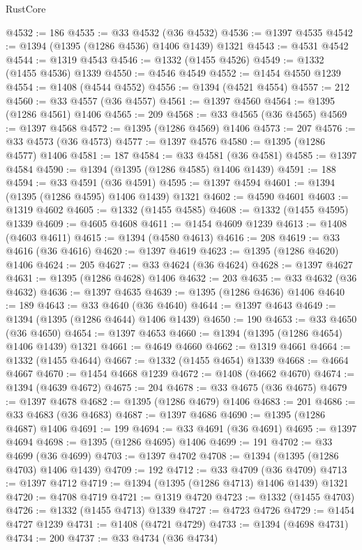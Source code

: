 \begin{lexlean}{RustCore}
\begin{coremodule}
@4532 := 186
@4535 := @33 @4532 (@36 @4532)
@4536 := @1397 @4535
@4542 := @1394 (@1395 (@1286 @4536) @1406 @1439) @1321
@4543 := @4531 @4542
@4544 := @1319 @4543
@4546 := @1332 (@1455 @4526)
@4549 := @1332 (@1455 @4536) @1339
@4550 := @4546 @4549
@4552 := @1454 @4550 @1239
@4554 := @1408 (@4544 @4552)
@4556 := @1394 (@4521 @4554)
@4557 := 212
@4560 := @33 @4557 (@36 @4557)
@4561 := @1397 @4560
@4564 := @1395 (@1286 @4561) @1406
@4565 := 209
@4568 := @33 @4565 (@36 @4565)
@4569 := @1397 @4568
@4572 := @1395 (@1286 @4569) @1406
@4573 := 207
@4576 := @33 @4573 (@36 @4573)
@4577 := @1397 @4576
@4580 := @1395 (@1286 @4577) @1406
@4581 := 187
@4584 := @33 @4581 (@36 @4581)
@4585 := @1397 @4584
@4590 := @1394 (@1395 (@1286 @4585) @1406 @1439)
@4591 := 188
@4594 := @33 @4591 (@36 @4591)
@4595 := @1397 @4594
@4601 := @1394 (@1395 (@1286 @4595) @1406 @1439) @1321
@4602 := @4590 @4601
@4603 := @1319 @4602
@4605 := @1332 (@1455 @4585)
@4608 := @1332 (@1455 @4595) @1339
@4609 := @4605 @4608
@4611 := @1454 @4609 @1239
@4613 := @1408 (@4603 @4611)
@4615 := @1394 (@4580 @4613)
@4616 := 208
@4619 := @33 @4616 (@36 @4616)
@4620 := @1397 @4619
@4623 := @1395 (@1286 @4620) @1406
@4624 := 205
@4627 := @33 @4624 (@36 @4624)
@4628 := @1397 @4627
@4631 := @1395 (@1286 @4628) @1406
@4632 := 203
@4635 := @33 @4632 (@36 @4632)
@4636 := @1397 @4635
@4639 := @1395 (@1286 @4636) @1406
@4640 := 189
@4643 := @33 @4640 (@36 @4640)
@4644 := @1397 @4643
@4649 := @1394 (@1395 (@1286 @4644) @1406 @1439)
@4650 := 190
@4653 := @33 @4650 (@36 @4650)
@4654 := @1397 @4653
@4660 := @1394 (@1395 (@1286 @4654) @1406 @1439) @1321
@4661 := @4649 @4660
@4662 := @1319 @4661
@4664 := @1332 (@1455 @4644)
@4667 := @1332 (@1455 @4654) @1339
@4668 := @4664 @4667
@4670 := @1454 @4668 @1239
@4672 := @1408 (@4662 @4670)
@4674 := @1394 (@4639 @4672)
@4675 := 204
@4678 := @33 @4675 (@36 @4675)
@4679 := @1397 @4678
@4682 := @1395 (@1286 @4679) @1406
@4683 := 201
@4686 := @33 @4683 (@36 @4683)
@4687 := @1397 @4686
@4690 := @1395 (@1286 @4687) @1406
@4691 := 199
@4694 := @33 @4691 (@36 @4691)
@4695 := @1397 @4694
@4698 := @1395 (@1286 @4695) @1406
@4699 := 191
@4702 := @33 @4699 (@36 @4699)
@4703 := @1397 @4702
@4708 := @1394 (@1395 (@1286 @4703) @1406 @1439)
@4709 := 192
@4712 := @33 @4709 (@36 @4709)
@4713 := @1397 @4712
@4719 := @1394 (@1395 (@1286 @4713) @1406 @1439) @1321
@4720 := @4708 @4719
@4721 := @1319 @4720
@4723 := @1332 (@1455 @4703)
@4726 := @1332 (@1455 @4713) @1339
@4727 := @4723 @4726
@4729 := @1454 @4727 @1239
@4731 := @1408 (@4721 @4729)
@4733 := @1394 (@4698 @4731)
@4734 := 200
@4737 := @33 @4734 (@36 @4734)

\end{coremodule}
\end{lexlean}
